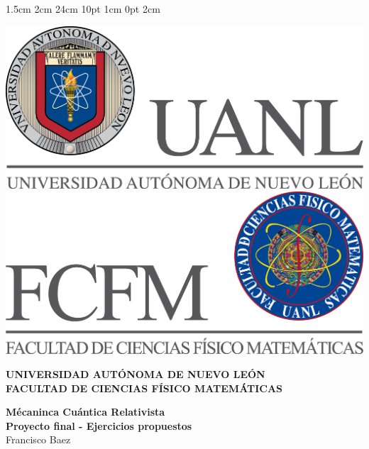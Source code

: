 \setmargins{2.5cm}      
{1.5cm}                     
{2cm}  
{24cm}                    
{10pt}                          
{1cm}                          
{0pt}                             
{2cm}
\begin{titlepage}
    \begin{center}
    \includegraphics[scale=0.40]{../../Logos/uanl.png} 
    \hspace{2.5cm}
    \includegraphics[scale=0.40]{../../Logos/fcfm.png}
    \end{center}
    \vspace{2cm}
    \begin{center}
    \textbf{
    UNIVERSIDAD AUTÓNOMA DE NUEVO LEÓN\\
    FACULTAD DE CIENCIAS
        FÍSICO MATEMÁTICAS}\\
    \vspace*{2cm}
    \begin{large}
    \vspace{1cm}
    \large{\textbf{Mécaninca Cuántica Relativista}}\\
    \textbf{Proyecto final - Ejercicios propuestos}\\
    Francisco Baez\\
    \end{large}
    \end{center}
    \vspace{3.5cm}

\end{titlepage}
